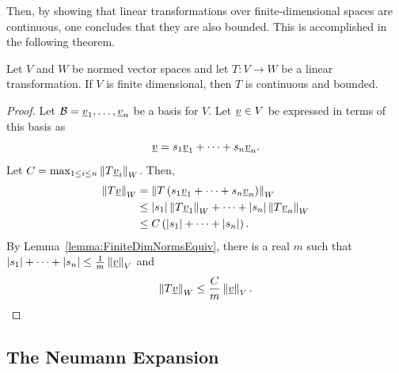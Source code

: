Then, by showing that linear transformations over finite-dimensional spaces are continuous, one concludes that they are also bounded.
This is accomplished in the following theorem.

\begin{theorem}
Let $V$ and $W$ be normed vector spaces and let $T \colon V \rightarrow W$ be a linear transformation.
If $V$ is finite dimensional, then $T$ is continuous and bounded.
\end{theorem}

\begin{proof}
Let $\mathcal{B} = \underline{v}_1, \ldots, \underline{v}_n$ be a basis for $V$.
Let $\underline{v} \in V$ be expressed in terms of this basis as
\begin{equation*}
\underline{v} = s_1 \underline{v}_1 + \cdots + s_n \underline{v}_n .
\end{equation*}
Let $C = \max_{1 \leq i \leq n} \left\| T \underline{v}_i \right\|_W$.
Then,
\begin{equation*}
\begin{split}
\left\| T \underline{v} \right\|_W &= \left\| T \left( s_1 \underline{v}_1 + \cdots + s_n \underline{v}_n \right) \right\|_W \\
& \leq |s_1| \left\| T \underline{v}_1 \right\|_W + \cdots + |s_n| \left\| T \underline{v}_n \right\|_W \\
&\leq C \left( |s_1| + \cdots + |s_n| \right) .
\end{split}
\end{equation*}
By Lemma~\ref{lemma:FiniteDimNormsEquiv}, there is a real $m$ such that  $|s_1| + \cdots + |s_n| \leq \frac{1}{m} \left\| \underline{v} \right\|_V$ and
\begin{equation*}
\left\| T \underline{v} \right\|_W \leq \frac{C}{m} \left\| \underline{v} \right\|_V . \qedhere
\end{equation*}
\end{proof}



\subsection{The Neumann Expansion}

